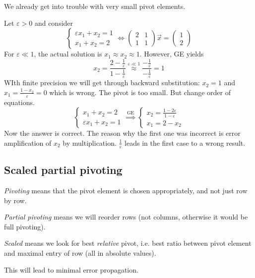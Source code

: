 We already get into trouble with
very small pivot elements.
\begin{example}
    Let $\varepsilon > 0$ and consider
    \[
        \begin{cases}
            \varepsilon x_1 + x_2 = 1\\
            x_1 + x_2 = 2
        \end{cases}
        \Longleftrightarrow
        \begin{pmatrix}
            2 & 1\\
            1 & 1
        \end{pmatrix}
        \vec{x} = \begin{pmatrix}
            1 \\ 2
        \end{pmatrix}
    \]
    For $\varepsilon \ll 1$, the actual solution is $x_1 \approx x_2 \approx 1$.
    However, GE yields
    \[
        x_2 = \frac{2 - \frac{1}{\varepsilon}}{1 - \frac{1}{\varepsilon}}
        \overset{\varepsilon \ll 1}{\approx}
        \frac{-\frac{1}{\varepsilon}}{-\frac{1}{\varepsilon}} = 1
    \] 
    WIth finite precision we will get through backward substitution:
    $x_2 = 1$ and $x_1 = \frac{1 - x_2}{\varepsilon} = 0$ which is wrong.
    The pivot is too small. But change order of equations.
    \[
        \begin{cases}
            x_1 + x_2 = 2\\
            \varepsilon x_1 + x_2 = 1
        \end{cases}
        \overset{\text{GE}}{\implies}
        \begin{cases}
            x_2 = \frac{1 - 2\varepsilon}{1 - \varepsilon}\\
            x_1 = 2 - x_2
        \end{cases}
    \]
    Now the answer is correct. The reason why the first one was incorrect is
    error amplification of $x_2$ by multiplication.
    $\frac{1}{\varepsilon}$ leads in the first case to a wrong result.
\end{example}

\pagebreak
\subsection{Scaled partial pivoting}
\begin{definition}
    \textit{Pivoting} means that the pivot element is chosen 
    appropriately, and not just row by row.
\end{definition}
\begin{definition}
    \textit{Partial pivoting} means we will reorder rows
    (not columns, otherwise it would be full pivoting).
\end{definition}
\begin{definition}
    \textit{Scaled} means we look for best \textit{relative} pivot,
    i.e. best ratio between pivot element and maximal entry of row
    (all in absolute values).
\end{definition}
\begin{remark}
    This will lead to minimal error propagation.
\end{remark}

